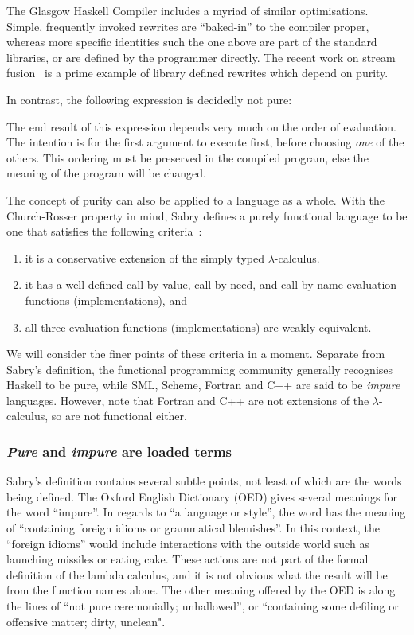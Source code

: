 The Glasgow Haskell Compiler includes a myriad of similar optimisations. Simple, frequently invoked rewrites are ``baked-in'' to the compiler proper, whereas more specific identities such the one above are part of the standard libraries, or are defined by the programmer directly. The recent work on stream fusion~\cite{coutts:stream-fusion} is a prime example of library defined rewrites which depend on purity.

In contrast, the following expression is decidedly not pure:


The end result of this expression depends very much on the order of evaluation.  The intention is for the first argument to execute first, before choosing \emph{one} of the others. This ordering must be preserved in the compiled program, else the meaning of the program will be changed.

The concept of purity can also be applied to a language as a whole. With the Church-Rosser property in mind, Sabry defines a purely functional language to be one that satisfies the following criteria~\cite{sabry:purely}:
\begin{enumerate}
\item	it is a conservative extension of the simply typed $\lambda$-calculus.
\item	it has a well-defined call-by-value, call-by-need, and call-by-name evaluation
	functions (implementations), and
\item	all three evaluation functions (implementations) are weakly equivalent.
\end{enumerate}

We will consider the finer points of these criteria in a moment. Separate from Sabry's definition, the functional programming community generally recognises Haskell to be pure, while SML, Scheme, Fortran and C++ are said to be \emph{impure} languages. However, note that Fortran and C++ are not extensions of the $\lambda$-calculus, so are not functional either.

\subsubsection{\emph{Pure} and \emph{impure} are loaded terms}
Sabry's definition contains several subtle points, not least of which are the words being defined. The Oxford English Dictionary (OED) gives several meanings for the word ``impure''. In regards to ``a language or style'', the word has the meaning of ``containing foreign idioms or grammatical blemishes''. In this context, the ``foreign idioms'' would include interactions with the outside world such as launching missiles or eating cake. These actions are not part of the formal definition of the lambda calculus, and it is not obvious what the result will be from the function names alone. The other meaning offered by the OED is along the lines of ``not pure ceremonially; unhallowed'', or ``containing some defiling or offensive matter; dirty, unclean".

